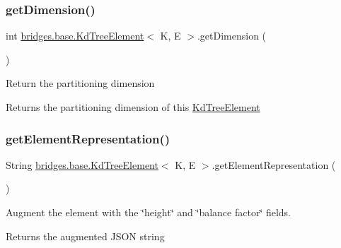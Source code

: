 \subsubsection{\texorpdfstring{get\+Dimension()}{getDimension()}}
{\footnotesize\ttfamily int \mbox{\hyperlink{classbridges_1_1base_1_1_kd_tree_element}{bridges.\+base.\+Kd\+Tree\+Element}}$<$ K, E $>$.get\+Dimension (\begin{DoxyParamCaption}{ }\end{DoxyParamCaption})}

Return the partitioning dimension

\begin{DoxyReturn}{Returns}
the partitioning dimension of this \mbox{\hyperlink{classbridges_1_1base_1_1_kd_tree_element}{Kd\+Tree\+Element}} 
\end{DoxyReturn}
\mbox{\label{classbridges_1_1base_1_1_kd_tree_element_adf9bed8c71a7c257a1359c3c88b808f0}} 
\subsubsection{\texorpdfstring{get\+Element\+Representation()}{getElementRepresentation()}}
{\footnotesize\ttfamily String \mbox{\hyperlink{classbridges_1_1base_1_1_kd_tree_element}{bridges.\+base.\+Kd\+Tree\+Element}}$<$ K, E $>$.get\+Element\+Representation (\begin{DoxyParamCaption}{ }\end{DoxyParamCaption})}

Augment the element with the \char`\"{}height\char`\"{} and \char`\"{}balance factor\char`\"{} fields.

\begin{DoxyReturn}{Returns}
the augmented J\+S\+ON string 
\end{DoxyReturn}
\mbox{\label{classbridges_1_1base_1_1_kd_tree_element_a257367edc8f204c973eb277dcb5d37be}} 
